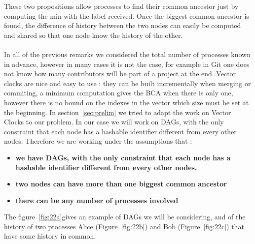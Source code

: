 These two propositions allow processes to find their common ancestor just by computing the min with the label received. Once the biggest common ancestor is found, the difference of history between the two nodes can easily be computed and shared so that one node know the history of the other.
\paragraph{} In all of the previous remarks we considered the total number of processes known in advance, however in many cases it is not the case, for example in Git one does not know how many contributors will be part of a project at the end. Vector clocks are nice and easy to use : they can be built incrementally when merging or commiting, a minimum computation gives the BCA when there is only one, however there is no bound on the indexes in the vector which size must be set at the beginning. In section~\ref{sec:prelim} we tried to adapt the work on Vector Clocks to our problem. In our case we will work on DAGs, with the only constraint that each node has a hashable identifier different from every other nodes. Therefore we are working under the assumptions that : 
\begin{itemize}
 \item \textbf{we have DAGs, with the only constraint that each node has a hashable identifier different from every other nodes.}
 \item \textbf{two nodes can have more than one biggest common ancestor}
 \item \textbf{there can be any number of processes involved}
\end{itemize}
The figure~\ref{fig:22a}gives an example of DAGs we will be considering, and of the history of two processes Alice (Figure~\ref{fig:22b}) and 
Bob (Figure~\ref{fig:22c}) that have some history in common.

